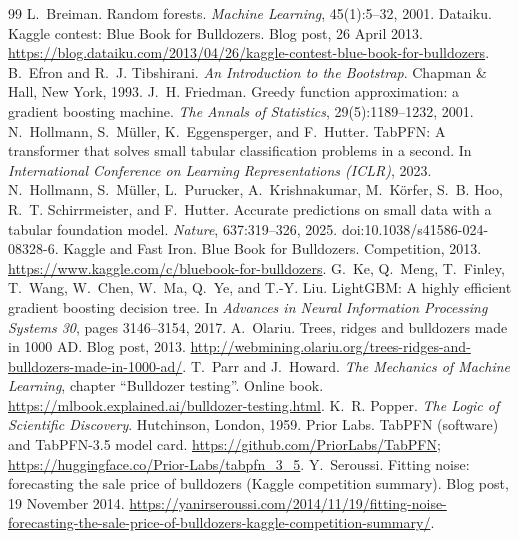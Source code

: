 \documentclass[11pt,a4paper]{article}
\begin{document}
\begin{thebibliography}{99}\small\sloppy
{} L.~Breiman. Random forests. \emph{Machine Learning}, 45(1):5--32, 2001.
 Dataiku. Kaggle contest: Blue Book for Bulldozers. Blog post, 26 April 2013. \url{https://blog.dataiku.com/2013/04/26/kaggle-contest-blue-book-for-bulldozers}.
 B.~Efron and R.~J. Tibshirani. \emph{An Introduction to the Bootstrap}. Chapman \& Hall, New York, 1993.
 J.~H. Friedman. Greedy function approximation: a gradient boosting machine. \emph{The Annals of Statistics}, 29(5):1189--1232, 2001.
 N.~Hollmann, S.~M\"uller, K.~Eggensperger, and F.~Hutter. TabPFN: A transformer that solves small tabular classification problems in a second. In \emph{International Conference on Learning Representations (ICLR)}, 2023.
 N.~Hollmann, S.~M\"uller, L.~Purucker, A.~Krishnakumar, M.~K\"orfer, S.~B. Hoo, R.~T. Schirrmeister, and F.~Hutter. Accurate predictions on small data with a tabular foundation model. \emph{Nature}, 637:319--326, 2025. doi:10.1038/s41586-024-08328-6.
 Kaggle and Fast Iron. Blue Book for Bulldozers. Competition, 2013. \url{https://www.kaggle.com/c/bluebook-for-bulldozers}.
 G.~Ke, Q.~Meng, T.~Finley, T.~Wang, W.~Chen, W.~Ma, Q.~Ye, and T.-Y. Liu. LightGBM: A highly efficient gradient boosting decision tree. In \emph{Advances in Neural Information Processing Systems 30}, pages 3146--3154, 2017.
 A.~Olariu. Trees, ridges and bulldozers made in 1000 AD. Blog post, 2013. \url{http://webmining.olariu.org/trees-ridges-and-bulldozers-made-in-1000-ad/}.
 T.~Parr and J.~Howard. \emph{The Mechanics of Machine Learning}, chapter ``Bulldozer testing''. Online book. \url{https://mlbook.explained.ai/bulldozer-testing.html}.
 K.~R. Popper. \emph{The Logic of Scientific Discovery}. Hutchinson, London, 1959.
 Prior Labs. TabPFN (software) and TabPFN-3.5 model card. \url{https://github.com/PriorLabs/TabPFN}; \url{https://huggingface.co/Prior-Labs/tabpfn_3_5}.
 Y.~Seroussi. Fitting noise: forecasting the sale price of bulldozers (Kaggle competition summary). Blog post, 19 November 2014. \url{https://yanirseroussi.com/2014/11/19/fitting-noise-forecasting-the-sale-price-of-bulldozers-kaggle-competition-summary/}.
\end{thebibliography}

\appendix
\end{document}
